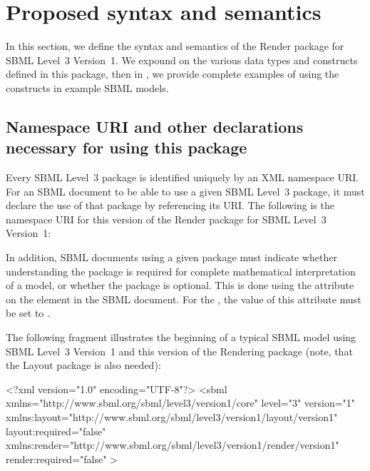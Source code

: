 
\section{Proposed syntax and semantics}
\label{syntax}

In this section, we define the syntax and semantics of the Render package for SBML Level~3 
Version~1.  We expound on the various
data types and constructs defined in this package, then in ,
we provide complete examples of using the constructs in example SBML
models.

\subsection{Namespace URI and other declarations necessary for using this
package}
\label{xml-namespace}

Every SBML Level~3 package is identified uniquely by an XML namespace URI.
For an SBML document to be able to use a given SBML Level~3 package, it
must declare the use of that package by referencing its URI.  The following
is the namespace URI for this version of the Render
package for SBML Level~3 Version~1:
\begin{center}
\end{center}

In addition, SBML documents using a given package must indicate whether understanding the package is required for complete mathematical interpretation of a model, or whether the package is optional.  This is done using the attribute  on the  element in the SBML document.  For the \RenderPackage, the value of this attribute must be set to .

The following fragment illustrates the beginning of a typical SBML model
using SBML Level~3 Version~1 and this version of the Rendering package (note, that the Layout package is also needed):

\begin{example}
<?xml version="1.0" encoding="UTF-8"?>
 <sbml xmlns="http://www.sbml.org/sbml/level3/version1/core" level="3" version="1"
   xmlns:layout="http://www.sbml.org/sbml/level3/version1/layout/version1" layout:required="false"
   xmlns:render="http://www.sbml.org/sbml/level3/version1/render/version1" render:required="false"
	>
	
\end{example}


